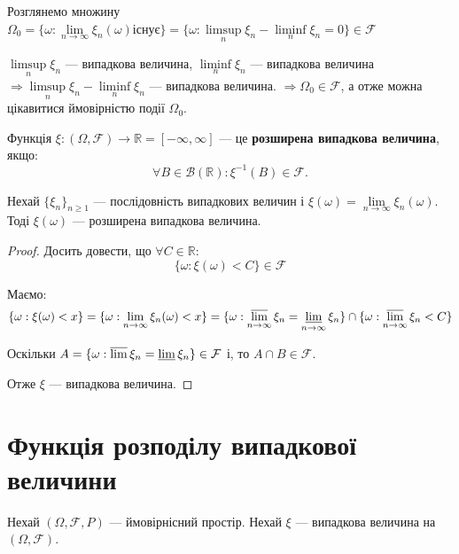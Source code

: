 \begin{remark}
    Розглянемо множину
    $\Omega_0
    = \{\omega: \lim\limits_{n \rightarrow \infty} \xi_n(\omega) \text{існує}\}
    = \{\omega: \limsup\limits_{n} \xi_n - \liminf\limits_{n} \xi_n = 0\} \in \mathcal{F}$
    
    $\limsup\limits_{n} \xi_n$ --- випадкова величина,
    $\liminf\limits_{n} \xi_n$ --- випадкова величина
    $\Rightarrow \limsup\limits_{n} \xi_n - \liminf\limits_{n} \xi_n$
    --- випадкова величина. $\Rightarrow \Omega_0 \in \mathcal{F}$,
    а отже можна цікавитися ймовірністю події $\Omega_0$.
\end{remark}

\begin{definition}
    Функція $\xi: (\Omega, \mathcal{F}) \rightarrow \mathbb{R} = [-\infty, \infty]$
    --- це \textbf{розширена випадкова величина}, якщо:
    $$\forall B \in \mathcal{B}(\mathbb{R}): \xi^{-1}(B) \in \mathcal{F}.$$
\end{definition}

\begin{theorem}
    Нехай $\{\xi_n\}_{n \geqslant 1}$ --- послідовність випадкових величин і
    $\xi(\omega) = \lim\limits_{n \rightarrow \infty} \xi_n(\omega)$.
    Тоді $\xi(\omega)$ --- розширена випадкова величина.
\end{theorem}
\begin{proof}
    Досить довести, що $\forall C \in \mathbb{R}$:
    $$\{\omega: \xi(\omega) < C\} \in \mathcal{F}$$
    
    Маємо:
    $$\{\omega: \xi(\omega) < x\}
    = \{\omega: \lim\limits_{n \rightarrow \infty} \xi_n(\omega) < x\}
    = \{\omega: \varlimsup\limits_{n \rightarrow \infty} \xi_n = \varliminf\limits_{n \rightarrow \infty} \xi_n \}
    \cap \{\omega: \varlimsup\limits_{n \rightarrow \infty} \xi_n < C\}$$
    
    Оскільки $A = \{\omega: \varlimsup \xi_n = \varliminf \xi_n \} \in \mathcal{F}$
    і, то $A \cap B \in \mathcal{F}$.
    
    Отже $\xi$ --- випадкова величина.
\end{proof}

\section{Функція розподілу випадкової величини}

Нехай $(\Omega, \mathcal{F}, P)$ --- ймовірнісний простір.
Нехай $\xi$ --- випадкова величина на $(\Omega, \mathcal{F})$.

